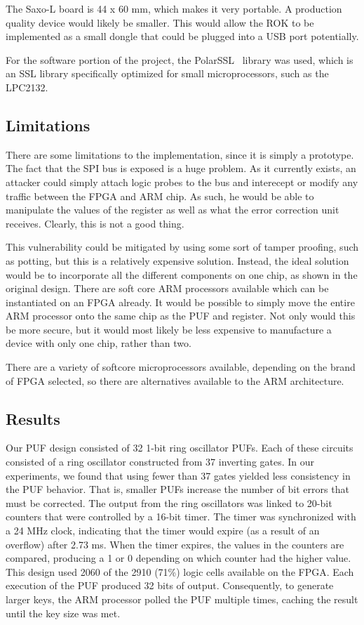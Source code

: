 The Saxo-L board is 44 x 60 mm, which makes it very portable. A production quality device would likely be smaller.
This would allow the ROK to be implemented as a small dongle that could be plugged into a USB port potentially.

For the software portion of the project, the PolarSSL~\cite{polarssl} library was used, which is an SSL library
specifically optimized for small microprocessors, such as the LPC2132.

\subsection{Limitations}
There are some limitations to the implementation, since it is simply a prototype. The fact that the SPI bus is exposed
is a huge problem. As it currently exists, an attacker could simply attach logic probes to the bus and interecept or
modify any traffic between the FPGA and ARM chip. As such, he would be able to manipulate the values of the register
as well as what the error correction unit receives. Clearly, this is not a good thing.

This vulnerability could be mitigated by using some sort of tamper proofing, such as potting, but this is a relatively
expensive solution. Instead, the ideal solution would be to incorporate all the different components on one chip, as
shown in the original design. There are soft core ARM processors available which can be instantiated on an FPGA
already. It would be possible to simply move the entire ARM processor onto the same chip as the PUF and register.
Not only would this be more secure, but it would most likely be less expensive to manufacture a device with only
one chip, rather than two.

There are a variety of softcore microprocessors available, depending on the brand of FPGA selected, so there are
alternatives available to the ARM architecture.

\subsection{Results}
Our PUF design consisted of 32 1-bit ring oscillator PUFs.
Each of these circuits consisted of a ring oscillator constructed from 37 inverting gates.
In our experiments, we found that using fewer than 37 gates yielded less consistency in the
PUF behavior.  That is, smaller PUFs increase the number of bit errors that must be corrected.
The output from the ring oscillators was linked to 20-bit
counters that were controlled by a 16-bit timer.  The timer was synchronized with a 24 MHz
clock, indicating that the timer would expire (as a result of an overflow) after 2.73 ms.
When the timer expires, the values in the counters are compared, producing a 1 or 0 depending
on which counter had the higher value.
This design used 2060 of the 2910 (71\%) logic cells available on the FPGA.  Each execution
of the PUF produced 32 bits of output.  Consequently, to generate larger keys, the ARM processor
polled the PUF multiple times, caching the result until the key size was met.


